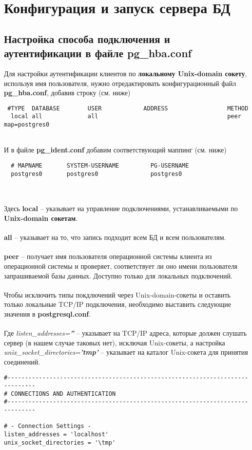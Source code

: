 \documentclass{article}
\begin{document}
\section{Конфигурация и запуск сервера БД}

\subsection{Настройка способа подключения и аутентификации в файле pg\_hba.conf}
Для настройки аутентификации клиентов по \textbf{локальному Unix-domain сокету}, используя имя пользователя, нужно отредактировать конфигурационный файл \textbf{pg\_hba.conf}, добавив строку (см. ниже)

\begin{verbatim}
 #TYPE  DATABASE        USER            ADDRESS                 METHOD
  local all             all                                     peer  map=postgres0
\end{verbatim}
\\
И в файле \textbf{pg\_ident.conf} добавим соответствующий маппинг (см. ниже)
\begin{verbatim}
  # MAPNAME       SYSTEM-USERNAME         PG-USERNAME
  postgres0       postgres0               postgres0
\end{verbatim}
\\ \\
Здесь \textbf{local} – указывает на управление подключениями, устанавливаемыми по \textbf{Unix-domain сокетам}. \\ \\ 
\textbf{all} – указывает на то, что запись подходит всем БД и всем пользователям. \\ \\ 
\textbf{peer} – получает имя пользователя операционной системы клиента из операционной системы и проверяет, соответствует ли оно имени пользователя запрашиваемой базы данных. Доступно только для локальных подключений.
\\ \\ 
Чтобы исключить типы покдлючений через Unix-domain-сокеты и оставить только локальные TCP/IP подключения, необходимо выставить следующие значения в \textbf{postgresql.conf}. \\ \\
Где \textit{listen\_addresses=\textbf{''}} – указывает на TCP/IP адреса, которые должен слушать сервер (в нашем случае таковых нет), исключая Unix-сокеты, а настройка \textit{unix\_socket\_directories=\textbf{'\/tmp'}} – указывает на каталог Unix-сокета для принятия соединений.
\begin{verbatim}
#------------------------------------------------------------------------------
# CONNECTIONS AND AUTHENTICATION
#------------------------------------------------------------------------------

# - Connection Settings -
listen_addresses = 'localhost'
unix_socket_directories = '\tmp'
\end{verbatim}
\\ \\ 
\end{document}
